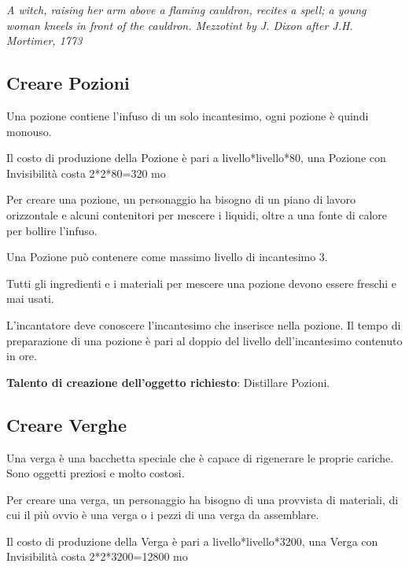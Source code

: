 \begin{multicols}{2}
\begin{center}
\textit{A witch, raising her arm above a flaming cauldron, recites a spell; a young woman kneels in front of the cauldron. Mezzotint by J. Dixon after J.H. Mortimer, 1773}
\end{center}

\subsection{Creare Pozioni}

Una pozione contiene l'infuso di un solo incantesimo, ogni pozione è quindi monouso.

\medskip

Il costo di produzione della Pozione è pari a livello*livello*80, una Pozione con Invisibilità costa 2*2*80=320 mo

\bigskip

Per creare una pozione, un personaggio ha bisogno di un piano di lavoro orizzontale e alcuni contenitori per mescere i liquidi, oltre a una fonte di calore per bollire l'infuso.

Una Pozione può contenere come massimo livello di incantesimo 3.

Tutti gli ingredienti e i materiali per mescere una pozione devono essere freschi e mai usati.

L'incantatore deve conoscere l'incantesimo che inserisce nella pozione. Il tempo di preparazione di una pozione è pari al doppio del livello dell'incantesimo contenuto in ore.

\medskip

\textbf{Talento di creazione dell'oggetto richiesto}: Distillare Pozioni.

\subsection{Creare Verghe}

Una verga è una bacchetta speciale che è capace di rigenerare le proprie cariche. Sono oggetti preziosi e molto costosi.

Per creare una verga, un personaggio ha bisogno di una provvista di materiali, di cui il più ovvio è una verga o i pezzi di una verga da assemblare.

\medskip

Il costo di produzione della Verga è pari a livello*livello*3200, una Verga con Invisibilità costa 2*2*3200=12800 mo

\bigskip


\end{multicols}
